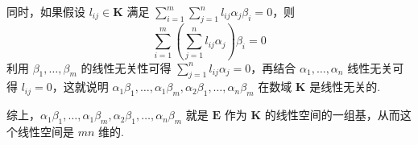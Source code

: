 \begin{enumerate}
          同时，如果假设 $ l_{ij} \in \mathbf{K} $ 满足 $ \displaystyle\sum_{i = 1}^{m} \sum_{j = 1}^{n} l_{ij} \alpha_j \beta_i = 0 $，则
          \[ \sum_{i = 1}^{m} \left(\sum_{j = 1}^{n} l_{ij} \alpha_j\right) \beta_i = 0 \]
          利用 $ \beta_1, \ldots, \beta_m $ 的线性无关性可得 $ \displaystyle\sum_{j = 1}^{n} l_{ij} \alpha_j = 0 $，再结合 $ \alpha_1, \ldots, \alpha_n $ 线性无关可得 $ l_{ij} = 0 $，这就说明 $ \alpha_1 \beta_1, \ldots, \alpha_1 \beta_m, \alpha_2 \beta_1, \ldots, \alpha_n \beta_m $ 在数域 $ \mathbf{K} $ 是线性无关的.

          综上，$ \alpha_1 \beta_1, \ldots, \alpha_1 \beta_m, \alpha_2 \beta_1, \ldots, \alpha_n \beta_m $ 就是 $ \mathbf{E} $ 作为 $ \mathbf{K} $ 的线性空间的一组基，从而这个线性空间是 $ mn $ 维的.
\end{enumerate}

\clearpage

